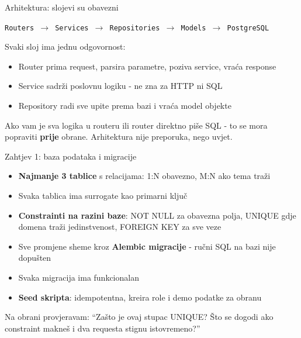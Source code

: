 \begin{frame}{Arhitektura: slojevi su obavezni}
\vspace{0.2em}
\begin{center}
\texttt{Routers $\rightarrow$ Services $\rightarrow$ Repositories $\rightarrow$ Models $\rightarrow$ PostgreSQL}
\end{center}

\vspace{0.6em}
Svaki sloj ima jednu odgovornost:
\begin{itemize}
  \item Router prima request, parsira parametre, poziva service, vraća response
  \item Service sadrži poslovnu logiku - ne zna za HTTP ni SQL
  \item Repository radi sve upite prema bazi i vraća model objekte
\end{itemize}

\vspace{0.6em}
Ako vam je sva logika u routeru ili router direktno piše SQL - to se mora popraviti \textbf{prije} obrane. Arhitektura nije preporuka, nego uvjet.
\end{frame}


\begin{frame}{Zahtjev 1: baza podataka i migracije}
\begin{itemize}
  \item \textbf{Najmanje 3 tablice} s relacijama: 1:N obavezno, M:N ako tema traži
  \item Svaka tablica ima surrogate  kao primarni ključ
  \item \textbf{Constrainti na razini baze}: NOT NULL za obavezna polja, UNIQUE gdje domena traži jedinstvenost, FOREIGN KEY za sve veze
  \item Sve promjene sheme kroz \textbf{Alembic migracije} - ručni SQL na bazi nije dopušten
  \item Svaka migracija ima funkcionalan 
  \item \textbf{Seed skripta}: idempotentna, kreira role i demo podatke za obranu
\end{itemize}

\vspace{0.4em}
Na obrani provjeravam: \enquote{Zašto je ovaj stupac UNIQUE? Što se dogodi ako constraint makneš i dva requesta stignu istovremeno?}
\end{frame}

